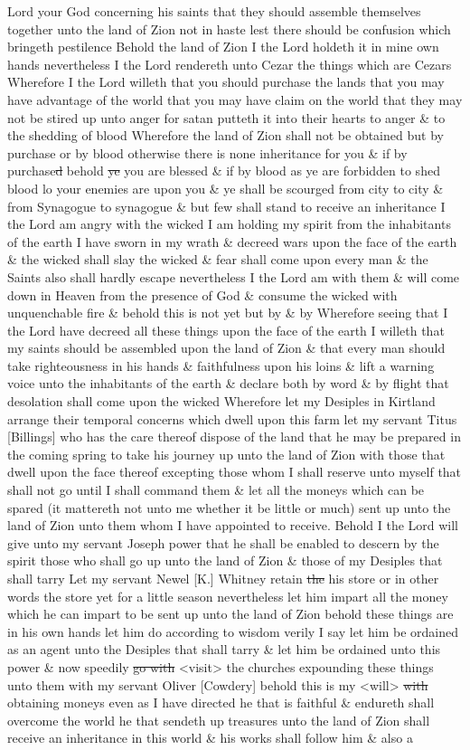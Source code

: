 {Lord your God concerning his saints that they should assemble themselves together unto the land of Zion not in haste lest there should be confusion which bringeth pestilence Behold the land of Zion I the Lord holdeth it in mine own hands nevertheless I the Lord rendereth unto Cezar the things which are Cezars Wherefore I the Lord willeth that you should purchase the lands that you may have advantage of the world that you may have claim on the world that they may not be stired up unto anger for satan putteth it into their hearts to anger \& to the shedding of blood Wherefore the land of Zion shall not be obtained but by purchase or by blood otherwise there is none inheritance for you \& if by purchase\sout{d} behold \sout{ye} you are blessed \& if by blood as ye are forbidden to shed blood lo your enemies are upon you \& ye shall be scourged from city to city \& from Synagogue to synagogue \& but few shall stand to receive an inheritance I the Lord am angry with the wicked I am holding my spirit from the inhabitants of the earth I have sworn in my wrath \& decreed wars upon the face of the earth \& the wicked shall slay the wicked \& fear shall come upon every man \& the Saints also shall hardly escape nevertheless I the Lord am with them \& will come down in Heaven from the presence of God \& consume the wicked with unquenchable fire \& behold this is not yet but by \& by Wherefore seeing that I the Lord have decreed all these things upon the face of the earth I willeth that my saints should be assembled upon the land of Zion \& that every man should take righteousness in his hands \& faithfulness upon his loins \& lift a warning voice unto the inhabitants of the earth \& declare both by word \& by flight that desolation shall come upon the wicked Wherefore let my Desiples in Kirtland arrange their temporal concerns which dwell upon this farm let my servant Titus [Billings] who has the care thereof dispose of the land that he may be prepared in the coming spring to take his journey up unto the land of Zion with those that dwell upon the face thereof excepting those whom I shall reserve unto myself that shall not go until I shall command them \& let all the moneys which can be spared (it mattereth not unto me whether it be little or much) sent up unto the land of Zion unto them whom I have appointed to receive. Behold I the Lord will give unto my servant Joseph power that he shall be enabled to descern by the spirit those who shall go up unto the land of Zion \& those of my Desiples that shall tarry Let my servant Newel [K.] Whitney retain \sout{the} his store or in other words the store yet for a little season nevertheless let him impart all the money which he can impart to be sent up unto the land of Zion behold these things are in his own hands let him do according to wisdom verily I say let him be ordained as an agent unto the Desiples that shall tarry \& let him be ordained unto this power \& now speedily \sout{go with} <visit> the churches expounding these things unto them with my servant Oliver [Cowdery] behold this is my <will> \sout{with} obtaining moneys even as I have directed he that is faithful \& endureth shall overcome the world he that sendeth up treasures unto the land of Zion shall receive an inheritance in this world \& his works shall follow him \& also a }
